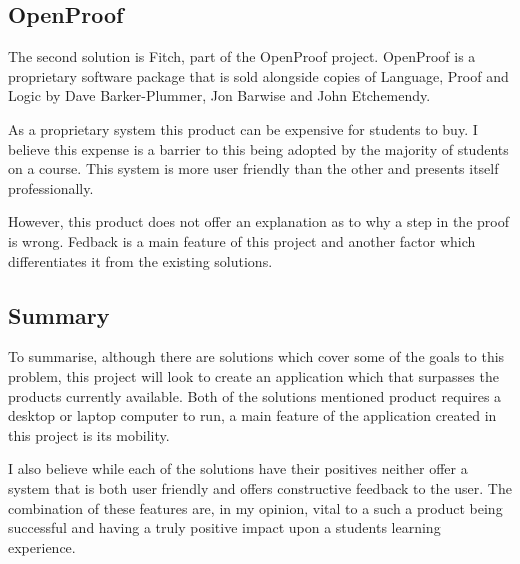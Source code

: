 \subsection{OpenProof}

The second solution is Fitch, part of the OpenProof project. OpenProof is a proprietary software package that is sold alongside copies of Language, Proof and Logic by Dave Barker-Plummer, Jon Barwise and John Etchemendy. \cite{barker2011language}

As a proprietary system this product can be expensive for students to buy. I believe this expense is a barrier to this being adopted by the majority of students on a course. This system is more user friendly than the other and presents itself professionally. 

However, this product does not offer an explanation as to why a step in the proof is wrong. Fedback is a main feature of this project and another factor which differentiates it from the existing solutions.

\subsection{Summary}

To summarise, although there are solutions which cover some of the goals to this problem, this project will look to create an application which that surpasses the products currently available. Both of the solutions mentioned product requires a desktop or laptop computer to run, a main feature of the application created in this project is its mobility. 

I also believe while each of the solutions have their positives neither offer a system that is both user friendly and offers constructive feedback to the user. The combination of these features are, in my opinion, vital to a such a product being successful and having a truly positive impact upon a students learning experience.